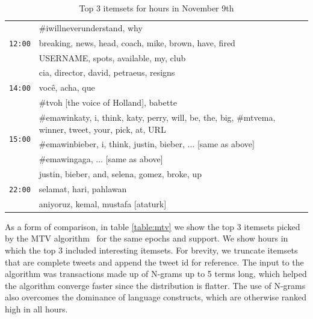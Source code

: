 \documentclass{sig-alternate}
\begin{document}
\begin{table}
\begin{center}
\small
\def\arraystretch{1.1}
\begin{tabular}{|p{.6cm}|p{7.5cm}|}

\hline
\multirow{3}{*}{\texttt{12:00}} 
& \#iwillneverunderstand, why\\\cline{2-2}
& breaking, news, head, coach, mike, brown, have, fired  \\\cline{2-2}
& USERNAME, spots, available, my, club \\\hline
\multirow{3}{*}{\texttt{14:00}} 
& cia, director, david, petraeus, resigns \\\cline{2-2}
& voc\^{e}, acha, que \\\cline{2-2}
& \#tvoh [the voice of Holland], babette \\\hline
\multirow{3}{*}{\texttt{15:00}} & \#emawinkaty, i, think, katy, perry, will, be, the, big,  \#mtvema, winner, tweet, your, pick, at, URL
\\ \cline{2-2}
& \#emawinbieber, i, think, justin, bieber, ... [same as above] \\ \cline{2-2}
& \#emawingaga, ... [same as above]  \\\hline														
\multirow{3}{*}{\texttt{22:00}} & justin, bieber, and, selena, gomez, broke, up
\\ \cline{2-2}
& selamat, hari, pahlawan \\\cline{2-2}
& aniyoruz, kemal, mustafa [ataturk] \\ \hline
\end{tabular}
\end{center}
\caption{Top 3 itemsets for hours in November 9th}
 \label{table:nov9}
\end{table}


As a form of comparison, in table \ref{table:mtv} we show the top 3 itemsets picked by the MTV algorithm~\cite{mampaey2011tell} for the same epochs and support.
% 
We show hours in which the top 3 included interesting itemsets. For brevity, we truncate itemsets that are complete tweets and append the tweet id for reference.
% 
The input to the algorithm was transactions made up of N-grams up to 5 terms long, which helped the algorithm converge faster since the distribution is flatter. 
The use of N-grams also overcomes the dominance of language constructs, which are otherwise ranked high in all hours. 
\end{document}
